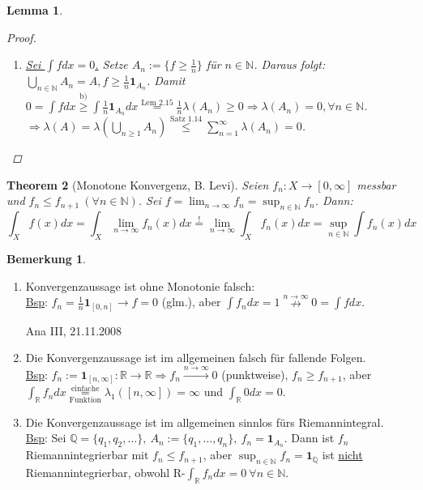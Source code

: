 \documentclass[a4paper]{scrreprt}
\newcommand{\doubleOne}{\textbf{1}}
\newcommand{\R}{\mathbb{R}}
\newcommand{\N}{\mathbb{N}}
\newcommand{\Q}{\mathbb{Q}}
\newcommand{\toInf}{\rightarrow \infty}
\newcommand{\limToInf}[1]{\lim_{#1 \toInf}}
\newcommand{\jlabel}[1]{\label{j_#1}}
\newcommand{\jshortlink}[1]{\jhyperref{#1}{\text{#1}}}
\newcommand{\jhyperref}[2]{\hyperref[j_#1]{#2}}
\newcommand{\jabb}[3]{ #1: #2 \rightarrow #3 }
\newcommand{\jspacesmall}{\vspace{4pt}}
\newcommand{\jdate}[1]{\jspacesmall\begin{center}\jlabel{#1}\tiny{Ana III, #1}\end{center}}
\theoremstyle{plain}
\newtheorem{thm}{Theorem}[chapter]
\newtheorem{lem}[thm]{Lemma}
\theoremstyle{definition}
\newtheorem*{bem*}{Bemerkung}
\begin{document}
{{{\begin{lem}
\begin{proof}
\begin{enumerate}
\begin{enumerate}
                    \item
                        \uline{Sei $\int f dx = 0$.} Setze $A_n := \{f \ge \frac{1}{n}\}$ für $n \in \N$. Daraus folgt: $\bigcup_{n \in \N} A_n = A, f \ge \frac{1}{n} \doubleOne_{A_n}$. Damit $0 = \int f dx \overset{\text{b)}}{\ge} \int \frac{1}{n} \doubleOne_{A_n} dx \overset{\jshortlink{Lem 2.15}}{=} \frac{1}{n}\lambda(A_n) \ge 0 \Rightarrow \lambda(A_n) = 0, \forall n \in \N$.\\
                        $\Rightarrow \lambda(A) = \lambda(\bigcup_{n \ge 1} A_n) \overset{\jshortlink{Satz 1.14}}{\le} \sum_{n=1}^\infty \lambda(A_n) = 0$.
                \end{enumerate}
        \end{enumerate}
    \end{proof}
\end{lem}


\begin{thm}[Monotone Konvergenz, B. Levi]
\jlabel{Thm 2.19}
\jlabel{BL}
    Seien $f_n:X \rightarrow [0, \infty]$ messbar und $f_n \le f_{n+1} \ (\forall n \in \N)$. Sei $f= \limToInf{n} f_n = \sup_{n \in \N} f_n$. Dann:
    \begin{displaymath}
        \int_X f(x)dx = \int_X \limToInf{n} f_n(x)dx \overset{!}{=} \limToInf{n} \int_X f_n(x)dx = \sup_{n\in\N} \int f_n(x)dx
    \end{displaymath}
\end{thm}

\begin{bem*}
    \begin{enumerate}
        \item Konvergenzaussage ist ohne Monotonie falsch:\\
            \uline{Bsp}: $f_n = \frac{1}{n} \doubleOne_{[0,n]} \rightarrow f = 0$ (glm.), aber $\int f_n dx = 1 \overset{n \toInf}{\nrightarrow} 0 = \int f dx$.
            
\jdate{21.11.2008}
            
        \item Die Konvergenzaussage ist im allgemeinen falsch für fallende Folgen.\\
            \uline{Bsp}: $f_n:=\jabb{\doubleOne_{[n,\infty]}}{\R}{\R} \Rightarrow f_n\xrightarrow{n\rightarrow \infty} 0$ (punktweise), $f_n \ge f_{n+1}$, aber $\int_\R f_n dx \overset{\text{einfache}}{\underset{\text{Funktion}}{=}} \lambda_1([n,\infty]) = \infty$ und $\int_\R 0 dx = 0$.
        \item Die Konvergenzaussage ist im allgemeinen sinnlos fürs Riemannintegral.\\
            \uline{Bsp}: Sei $\Q = \{q_1, q_2, \dots\},\ A_n:= \{q_1,\dots,q_n\},\ f_n = \doubleOne_{A_n}$. Dann ist $f_n$ Riemannintegrierbar mit $f_n \le f_{n+1}$, aber $\sup_{n\in\N} f_n = \doubleOne_\Q$ ist \uline{nicht} Riemannintegrierbar, obwohl R-$\int_\R f_n dx = 0 \ \forall n\in\N$.
    \end{enumerate}
\end{bem*}

}}}
\end{document}
